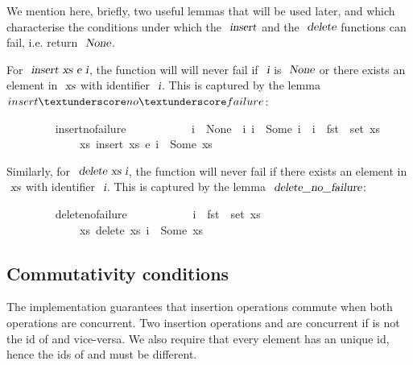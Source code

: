 \documentclass[acmlarge,review,anonymous]{acmart}\settopmatter{printfolios=true}
\begin{document}
We mention here, briefly, two useful lemmas that will be used later, and which characterise the conditions under which the $\isa{insert}$ and the $\isa{delete}$ functions can fail, i.e. return $\isa{None}$.

For $\isa{insert\ xs\ e\ i}$, the function will will never fail if $\isa{i}$ is $\isa{None}$ or there exists an element in $\isa{xs}$ with identifier $\isa{i}$.
This is captured by the lemma $insert{\isacharunderscore}no{\isacharunderscore}failure$:
\\
\begin{isabellebody}
\ \ \ \ \ \ \ \  insert{\isacharunderscore}no{\isacharunderscore}failure{\isacharcolon}\isanewline
\ \ \ \ \ \ \ \ \ \ \ {\isachardoublequoteopen}i\ {\isacharequal}\ None\ {\isasymor}\ {\isacharparenleft}{\isasymexists}i{\isacharprime}{\isachardot}\ i\ {\isacharequal}\ Some\ i{\isacharprime}\ {\isasymand}\ i{\isacharprime}\ {\isasymin}\ fst\ {\isacharbackquote}\ set\ xs{\isacharparenright}{\isachardoublequoteclose}\isanewline
\ \ \ \ \ \ \ \ \ \ \ \ \ {\isachardoublequoteopen}{\isasymexists}xs{\isacharprime}{\isachardot}\ insert\ xs\ e\ i\ {\isacharequal}\ Some\ xs{\isacharprime}{\isachardoublequoteclose}
\end{isabellebody}
\vspace{\baselineskip}
Similarly, for $\isa{delete\ xs\ i}$, the function will never fail if there exists an element in $\isa{xs}$ with identifier $\isa{i}$.
This is captured by the lemma $\isa{delete{\isacharunderscore}no{\isacharunderscore}failure}$:
\\
\begin{isabellebody}
\ \ \ \ \ \ \ \  delete{\isacharunderscore}no{\isacharunderscore}failure{\isacharcolon}\isanewline
\ \ \ \ \ \ \ \ \ \ \ {\isachardoublequoteopen}i\ {\isasymin}\ fst\ {\isacharbackquote}\ set\ xs{\isachardoublequoteclose}\isanewline
\ \ \ \ \ \ \ \ \ \ \ \ \ {\isachardoublequoteopen}{\isasymexists}xs{\isacharprime}{\isachardot}\ delete\ xs\ i\ {\isacharequal}\ Some\ xs{\isacharprime}{\isachardoublequoteclose}\isanewline
\end{isabellebody}

\subsection{Commutativity conditions}

The implementation guarantees that insertion operations commute when both
operations are concurrent. Two insertion operations 
and  are concurrent if  is not the id of 
and vice-versa. We also require that every element has an unique id, hence the
ids of  and  must be different.
\end{document}
